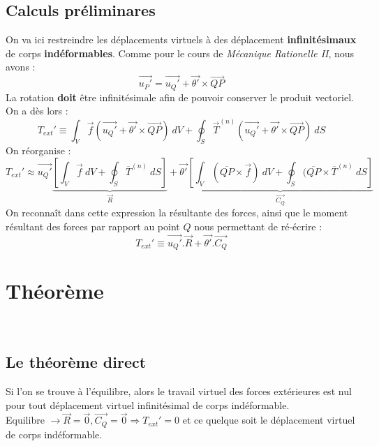	\subsection{Calculs préliminares}
	On va ici restreindre les déplacements virtuels à des déplacement \textbf{
	infinitésimaux} de corps \textbf{indéformables}. Comme pour le cours de 
	\textit{Mécanique Rationelle II}, nous avons :
	\begin{equation}
	\vec{u_P'} = \vec{u_Q'} + \vec{\theta'}\times\vec{QP}
	\end{equation}
	La rotation \textbf{doit} être infinitésimale afin de pouvoir conserver le
	produit vectoriel. On a dès lors :
	\begin{equation}
	T_{ext}' \equiv \int_V \vec{f}(\vec{u_Q'} + \vec{\theta'}\times\vec{QP})\ dV
	 + \oint_S \vec{T}^{(n)}(\vec{u_Q'} + \vec{\theta'}\times\vec{QP})\ dS
	\end{equation}	
	On réorganise :
	\begin{equation}
	T_{ext}' \approx \vec{u_Q'}\underbrace{\left[\int_V \vec{f}\ dV + \oint_S
	 \overline{T}^{(n)}\ dS \right]}_{\vec{R}} + \vec{\theta'}\underbrace{\left[
	 \int_V (\overline{QP}\times\vec{f})\ dV + \oint_S (\overline{QP}\times
	 \overline{T}^{(n)}\ dS\right]}_{\vec{C_Q}}
	\end{equation}
	On reconnaît dans cette expression la résultante des forces, ainsi que le 
	moment résultant des forces par rapport au point $Q$ nous permettant de 
	ré-écrire :
	\begin{equation}
	T_{ext}' \equiv \vec{u_Q'}.\vec{R} + \vec{\theta'}.\vec{C_Q}
	\end{equation}
	

\section{Théorème}
\ 
	
	\subsection{Le théorème direct}
	Si l'on se trouve à l'équilibre, alors le travail virtuel des forces 
	extérieures est nul pour tout déplacement virtuel infinitésimal de 
	corps indéformable.\\
	Equilibre $\rightarrow \vec{R}=\vec{0}, \vec{C_Q}=\vec{0} \Rightarrow T_{
	ext}' = 0$ et ce quelque soit le déplacement virtuel de corps indéformable.
	
